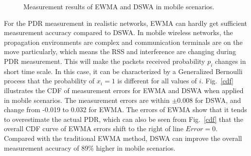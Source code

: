 \documentclass[draftclsnofoot,journal,onecolumn,11pt]{IEEEtran}
\begin{document}
\begin{figure}[!t]
\centerline{
}
\caption{Measurement results of EWMA and DSWA in mobile scenarios.}
\label{DSWA_error}
\end{figure}

For the PDR measurement in realistic networks, EWMA can hardly get sufficient measurement accuracy compared to DSWA. In mobile wireless networks, the propagation environments are complex and communication terminals are on the move particularly, which means the RSS and interference are changing during PDR measurement. This will make the packets received probability $p_i$ changes in short time scale. In this case, it can be characterized by a Generalized Bernoulli process that the probability of $x_i=1$ is different for all values of $i$. Fig.~\ref{cdf} illustrates the CDF of measurement errors for EWMA and DSWA when applied in mobile scenarios. The measurement errors are within $\pm$0.008 for DSWA, and change from -0.019 to 0.032 for EWMA. The errors of EWMA show that it tends to overestimate the actual PDR, which can also be seen from Fig.~\ref{cdf} that the overall CDF curve of EWMA errors shift to the right of line $Error=0$. Compared with the traditional EWMA method, DSWA can improve the overall measurement accuracy of 89\% higher in mobile scenarios.
\end{document}
